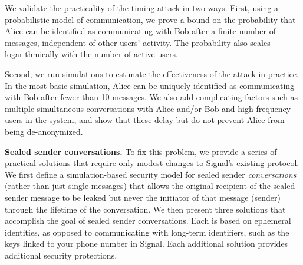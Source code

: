 \medskip
We validate the practicality of the timing attack in two ways. First,
using a probabilistic model of communication, we prove a bound on
the probability that Alice can be identified as communicating with Bob
after a finite number of messages, independent of other users' activity.
The probability also scales logarithmically with the number of active users.

Second, we run simulations to estimate the effectiveness of the attack in practice. In the most basic simulation, Alice can be uniquely identified as communicating with Bob after fewer than 10 messages. We also add complicating factors such as
multiple simultaneous conversations with Alice and/or Bob and
high-frequency users in the system, and show that these delay but do not
prevent Alice from being de-anonymized.





\medskip
\noindent
\textbf{Sealed sender conversations.} To fix this problem, we
provide a series of practical solutions that require only modest changes to Signal's
existing protocol.
We first define a simulation-based security model for sealed sender \emph{conversations}
(rather than just single messages) that allows the original recipient of the
sealed sender message to be leaked but never the initiator of that message
(sender)
through the lifetime of the conversation. We then present three solutions that
accomplish the goal of sealed sender conversations. Each is based on ephemeral
identities, as opposed to communicating with long-term identifiers, such as the keys linked to your phone number in Signal. Each additional solution provides additional security protections.


